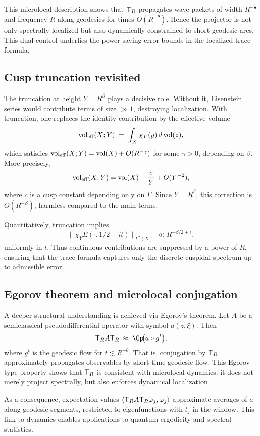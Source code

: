 This microlocal description shows that $\mathsf{T}_R$ propagates wave packets of width $R^{-\tfrac12}$ and frequency $R$ along geodesics for times $O(R^{-\theta})$. Hence the projector is not only spectrally localized but also dynamically constrained to short geodesic arcs. This dual control underlies the power-saving error bounds in the localized trace formula.

\subsection{Cusp truncation revisited}\label{subsec:microlocal-cusp}

The truncation at height $Y=R^\beta$ plays a decisive role. Without it, Eisenstein series would contribute terms of size $\gg 1$, destroying localization. With truncation, one replaces the identity contribution by the effective volume
\[
\operatorname{vol}_{\mathrm{eff}}(X;Y) \;=\; \int_{X} \chi_Y(y)\, d\operatorname{vol}(z),
\]
which satisfies $\operatorname{vol}_{\mathrm{eff}}(X;Y) = \operatorname{vol}(X) + O(R^{-\gamma})$ for some $\gamma>0$, depending on $\beta$. More precisely,
\[
\operatorname{vol}_{\mathrm{eff}}(X;Y) = \operatorname{vol}(X) - \frac{c}{Y} + O(Y^{-2}),
\]
where $c$ is a cusp constant depending only on $\Gamma$. Since $Y=R^\beta$, this correction is $O(R^{-\beta})$, harmless compared to the main terms.

Quantitatively, truncation implies
\[
\|\chi_Y E(\cdot,1/2+it)\|_{L^2(X)} \ll R^{-\beta/2+\epsilon},
\]
uniformly in $t$. Thus continuous contributions are suppressed by a power of $R$, ensuring that the trace formula captures only the discrete cuspidal spectrum up to admissible error.

\subsection{Egorov theorem and microlocal conjugation}\label{subsec:microlocal-egorov}

A deeper structural understanding is achieved via Egorov’s theorem. Let $A$ be a semiclassical pseudodifferential operator with symbol $a(z,\xi)$. Then
\[
\TR A \TR \;\approx\; \Op\!\big(a\circ g^t\big),
\]
where $g^t$ is the geodesic flow for $t\lesssim R^{-\theta}$. That is, conjugation by $\mathsf{T}_R$ approximately propagates observables by short-time geodesic flow. This Egorov-type property shows that $\mathsf{T}_R$ is consistent with microlocal dynamics: it does not merely project spectrally, but also enforces dynamical localization.

As a consequence, expectation values $\langle \mathsf{T}_R A \mathsf{T}_R \varphi_j,\varphi_j\rangle$ approximate averages of $a$ along geodesic segments, restricted to eigenfunctions with $t_j$ in the window. This link to dynamics enables applications to quantum ergodicity and spectral statistics.

